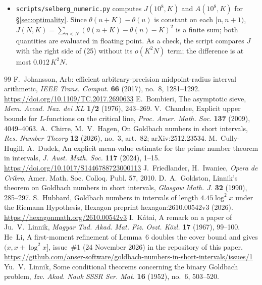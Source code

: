 \documentclass[11pt]{amsart}
\theoremstyle{remark}
\begin{document}
\begin{itemize}
\begin{itemize}
\item[--] \texttt{scripts/selberg\_numeric.py} computes $J(10^8,K)$ and $A(10^8,K)$ for \S\ref{sec:optimality}. Since $\theta(u+K)-\theta(u)$ is constant on each $[n,n+1)$, $J(N,K)=\sum_{n<N}(\theta(n+K)-\theta(n)-K)^2$ is a finite sum; both quantities are evaluated in floating point. As a check, the script compares $J$ with the right side of (25) without its $o(K^2N)$ term; the difference is at most $0.012\,K^2N$.
\end{itemize}
\end{itemize}

\begin{thebibliography}{99}
 F.~Johansson, Arb: efficient arbitrary-precision midpoint-radius interval arithmetic, \emph{IEEE Trans. Comput.} \textbf{66} (2017), no.~8, 1281--1292. \url{https://doi.org/10.1109/TC.2017.2690633}
 E.~Bombieri, The asymptotic sieve, \emph{Mem. Accad. Naz. dei XL} \textbf{1/2} (1976), 243--269.
 V.~Chandee, Explicit upper bounds for $L$-functions on the critical line, \emph{Proc. Amer. Math. Soc.} \textbf{137} (2009), 4049--4063.
 A.~Chirre, M.~V.~Hagen, On Goldbach numbers in short intervals, \emph{Res. Number Theory} \textbf{12} (2026), no.~3, art.~82; arXiv:2512.23534.
 M.~Cully-Hugill, A.~Dudek, An explicit mean-value estimate for the prime number theorem in intervals, \emph{J. Aust. Math. Soc.} \textbf{117} (2024), 1--15. \url{https://doi.org/10.1017/S1446788723000113}
 J.~Friedlander, H.~Iwaniec, \emph{Opera de Cribro}, Amer. Math. Soc. Colloq. Publ. 57, 2010.
 D.~A.~Goldston, Linnik's theorem on Goldbach numbers in short intervals, \emph{Glasgow Math. J.} \textbf{32} (1990), 285--297.
 S.~Hubbard, Goldbach numbers in intervals of length $4.45\log^2x$ under the Riemann Hypothesis, Hexagon preprint hexagon:2610.00542v3 (2026). \url{https://hexagonmath.org/2610.00542v3}
 I.~Kátai, A remark on a paper of Ju.~V.~Linnik, \emph{Magyar Tud. Akad. Mat. Fiz. Oszt. Közl.} \textbf{17} (1967), 99--100.
 He~Li, A first-moment refinement of Lemma~6 doubles the cover bound and gives $(x,x+\log^2x]$, issue~\#1 (24 November 2026) in the repository of this paper. \url{https://github.com/anser-software/goldbach-numbers-in-short-intervals/issues/1}
 Yu.~V.~Linnik, Some conditional theorems concerning the binary Goldbach problem, \emph{Izv. Akad. Nauk SSSR Ser. Mat.} \textbf{16} (1952), no.~6, 503--520.

\end{thebibliography}
\end{document}
